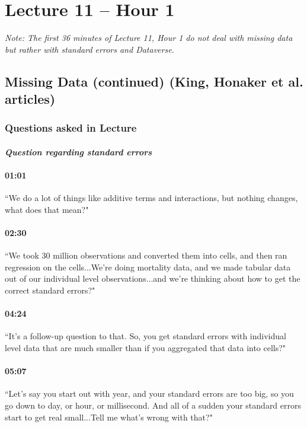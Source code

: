 \documentclass[11pt]{article}
\begin{document}
\section{Lecture 11 -- Hour 1}
\emph{Note: The first 36 minutes of Lecture 11, Hour 1 do not deal with missing data but rather with standard errors and Dataverse.}
\subsection{Missing Data (continued) (King, Honaker et al. articles)}

\subsubsection{Questions asked in Lecture}
\paragraph{\emph{Question regarding standard errors}}
\paragraph{01:01} ``We do a lot of things like additive terms and interactions, but nothing changes, what does that mean?"

\paragraph{02:30} ``We took 30 million observations and converted them into cells, and then ran regression on the cells...We're doing mortality data, and we made tabular data out of our individual level observations...and we're thinking about how to get the correct standard errors?"

\paragraph{04:24} ``It's a follow-up question to that. So, you get standard errors with individual level data that are much smaller than if you aggregated that data into cells?"

\paragraph{05:07} ``Let's say you start out with year, and your standard errors are too big, so you go down to day, or hour, or millisecond. And all of a sudden your standard errors start to get real small...Tell me what's wrong with that?"
\end{document}
